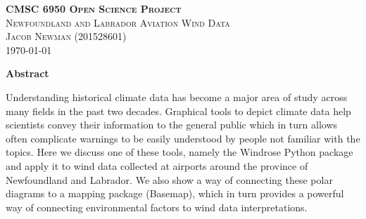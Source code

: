 \documentclass{article}
\begin{document}
\begin{titlepage}
\newcommand{\HRule}{\rule{\linewidth}{0.5mm}}

\center
\textsc{\LARGE \textbf{CMSC 6950 Open Science Project}}\\[1 cm]

\textsc{\Large Newfoundland and Labrador Aviation Wind Data}\\[0.5 cm]

\textsc{\large Jacob Newman (201528601)}\\[0.5 cm]





\vfill\vfill\vfill
{\large\today}
\vfill

\end{titlepage}

\begin{center}
\bf{Abstract}

Understanding historical climate data has become a major area of study across many fields in the past two decades. Graphical tools to depict climate data help scientists convey their information to the 
general public which in turn allows often complicate warnings to be easily understood by people not familiar with the topics. Here we discuss one of these tools, namely the Windrose Python package and 
apply it to wind data collected at airports around the province of Newfoundland and Labrador. We also show a way of connecting these polar diagrams to a mapping package (Basemap), which in turn provides 
a powerful way of connecting environmental factors to wind data interpretations.  

\end{center}
\end{document}
